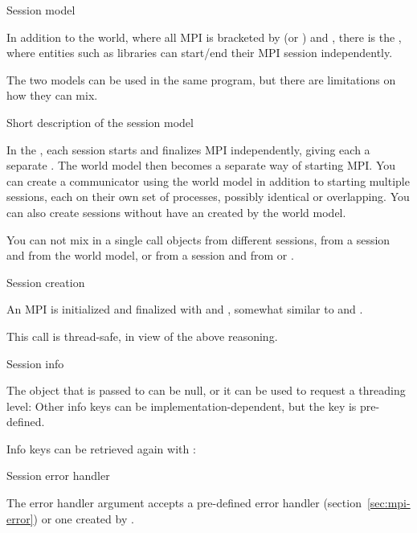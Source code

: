 \begin{mpifournote}{Session model}

In addition to the world,
where all MPI is bracketed by 
(or ) and ,
there is the ,
where entities such as libraries can start/end their MPI session
independently.

The two models can be used in the same program, but there are limitations
on how they can mix.

 {Short description of the session model}

In the ,
each session starts and finalizes MPI independently,
giving each a separate .
The world model then becomes a separate way of starting MPI.
You can create a communicator using the world model
in addition to starting multiple sessions,
each on
their own set of processes, possibly identical or overlapping.
You can also create sessions without have an 
created by the world model.

You can not mix in a single call objects
from different sessions,
from a session and from the world model,
or from a session and from 
or .

 {Session creation}

An MPI  is initialized and finalized
with  and ,
somewhat similar to  and .


This call is thread-safe, in view of the above reasoning.

 {Session info}

The  object that is passed to 
can be null, or
it can be used to request a threading level:
%
%
Other info keys can be implementation-dependent,
but the key  is pre-defined.

Info keys can be retrieved again with :
%

 {Session error handler}

The error handler argument accepts a pre-defined error handler
(section~\ref{sec:mpi-error})
or one created by .


\end{mpifournote}

